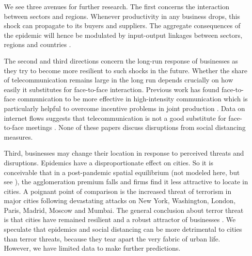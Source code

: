 We see three avenues for further research. The first concerns the interaction between sectors and regions. Whenever productivity in any business drops, this shock can propagate to its buyers and suppliers. The aggregate consequences of the epidemic will hence be modulated by input-output linkages between sectors, regions and countries \cite{Caliendo2014-mr,Caselli2020-nf,Baldwin2020-wb,Barrot2020-jf}.

The second and third directions concern the long-run response of businesses as they try to become more resilient to such shocks in the future. Whether the share of telecommunication remains large in the long run depends crucially on how easily it substitutes for face-to-face interaction. Previous work has found face-to-face communication to be more effective in high-intensity communication which is particularly helpful to overcome incentive problems in joint production \cite{Gaspar1998-gy,Storper2004-mg}. Data on internet flows suggests that telecommunication is not a good substitute for face-to-face meetings \cite{Cuberes2013-js}. None of these papers discuss disruptions from social distancing measures. 

Third, businesses may change their location in response to perceived threats and disruptions. Epidemics have a disproportionate effect on cities. So it is conceivable that in a post-pandemic spatial equilibrium (not modeled here, but see \cite{Tian2019-wq}), the agglomeration premium falls and firms find it less attractive to locate in cities. A poignant point of comparison is the increased threat of terrorism in major cities following devastating attacks on New York, Washington, London, Paris, Madrid, Moscow and Mumbai. The general conclusion about terror threat is that cities have remained resilient and a robust attractor of businesses \cite{Glaeser2002-mw,Harrigan2002-ik}. We speculate that epidemics and social distancing can be more detrimental to cities than terror threats, because they tear apart the very fabric of urban life. However, we have limited data to make further predictions.

